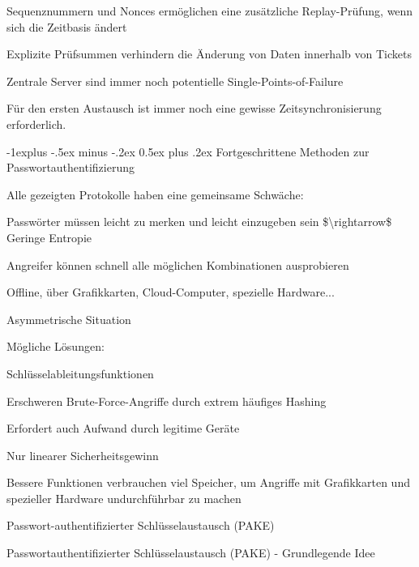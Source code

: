\documentclass[a4paper]{article}
\makeatletter
\renewcommand{\subsection}{\@startsection{subsection}{2}{0mm}%
 {-1explus -.5ex minus -.2ex}%
 {0.5ex plus .2ex}%
 {\normalfont\normalsize\bfseries}}
\makeatother
\begin{document}
\begin{multicols}{3}
\begin{itemize*}
            \begin{itemize*}
                  \item Sequenznummern und Nonces ermöglichen eine zusätzliche Replay-Prüfung, wenn sich die Zeitbasis ändert
                  \item Explizite Prüfsummen verhindern die Änderung von Daten innerhalb von Tickets
                  \item Zentrale Server sind immer noch potentielle Single-Points-of-Failure
                  \item Für den ersten Austausch ist immer noch eine gewisse Zeitsynchronisierung erforderlich.
            \end{itemize*}
      \end{itemize*}


      \subsection{Fortgeschrittene Methoden zur
            Passwortauthentifizierung}

      \begin{itemize*}
            \item
            Alle gezeigten Protokolle haben eine gemeinsame Schwäche:

            \begin{itemize*}
                  \item Passwörter müssen leicht zu merken und leicht einzugeben sein \$\textbackslash rightarrow\$ Geringe Entropie
                  \item Angreifer können schnell alle möglichen Kombinationen ausprobieren
                  \item Offline, über Grafikkarten, Cloud-Computer, spezielle Hardware...
                  \item Asymmetrische Situation
            \end{itemize*}
            \item
            Mögliche Lösungen:

            \begin{itemize*}
                  \item Schlüsselableitungsfunktionen
                  \begin{itemize*} \item Erschweren Brute-Force-Angriffe durch extrem häufiges Hashing \item Erfordert auch Aufwand durch legitime Geräte \item Nur linearer Sicherheitsgewinn \item Bessere Funktionen verbrauchen viel Speicher, um Angriffe mit Grafikkarten und spezieller Hardware undurchführbar zu machen \end{itemize*}
                  \item Passwort-authentifizierter Schlüsselaustausch (PAKE)
            \end{itemize*}
            \item
            Passwortauthentifizierter Schlüsselaustausch (PAKE) - Grundlegende
            Idee


\end{itemize*}
\end{multicols}
\end{document}
